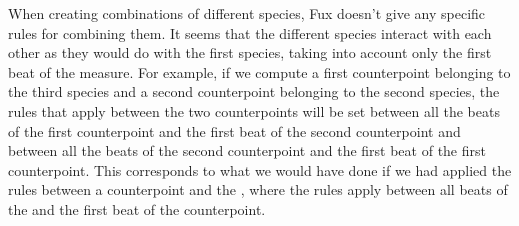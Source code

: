 When creating combinations of different species, Fux doesn't give any specific rules for combining them. It seems that the different species interact with each other as they would do with the first species, taking into account only the first beat of the measure. For example, if we compute a first counterpoint belonging to the third species and a second counterpoint belonging to the second species, the rules that apply between the two counterpoints will be set between all the beats of the first counterpoint and the first beat of the second counterpoint and between all the beats of the second counterpoint and the first beat of the first counterpoint. This corresponds to what we would have done if we had applied the rules between a counterpoint and the \cf, where the rules apply between all beats of the \cf and the first beat of the counterpoint.
